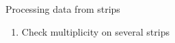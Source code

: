\begin{frame}[t]
\begin{columns}[T]
\begin{column}{0.45\textwidth}
\begin{block}{Processing data from strips}
\begin{enumerate}
          \item Check multiplicity on several strips
        \end{enumerate}
      \end{block}
    \end{column}
  \end{columns}
\end{frame}

